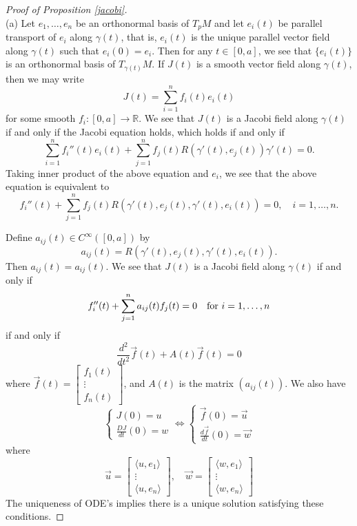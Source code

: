 \documentclass{amsart}
\numberwithin{equation}{section}
\theoremstyle{definition}
\theoremstyle{theorem}
\begin{document}
\begin{proof}[Proof of Proposition \ref{jacobi}] $ $\\
(a) Let $e_1, \ldots, e_n$ be an orthonormal basis of $T_pM$ and let $e_i(t)$ be parallel transport of $e_i$ along $\gamma(t)$, that is, $e_i(t)$ is the unique parallel vector field along $\gamma(t)$ such that $e_i(0) = e_i$. Then for any $t \in [0,a]$, 
we see that $\{e_i(t)\}$ is an orthonormal basis of $T_{\gamma(t)}M$. If $J(t)$ is a smooth vector field along $\gamma(t)$, then we may write 
\[
J(t) = \sum_{i=1}^n f_i(t)e_i(t)
\]
for some smooth $f_i : [0,a] \to \mathbb{R}$. We see that $J(t)$ is a Jacobi field along $\gamma(t)$ if and only if the Jacobi equation holds, 
which holds if and only if 
\[
\sum_{i=1}^n f_i''(t)e_i(t) + \sum_{j=1}^n f_j(t) R(\gamma'(t), e_j(t))\gamma'(t) = 0.
\]
Taking inner product of the above equation and $e_i$, we see that the above equation is equivalent to
$$
f_i''(t) +  \sum_{j=1}^n f_j(t) R(\gamma'(t), e_j(t),\gamma'(t),e_i(t)) =0,\quad i=1,\ldots,n.
$$

Define $a_{ij}(t)\in C^\infty([0,a])$ by 
\[
a_{ij}(t) = R(\gamma'(t), e_j(t), \gamma'(t), e_i(t)).
\]
Then $a_{ij}(t)= a_{ij}(t)$. We see that $J(t)$ is a Jacobi field along $\gamma(t)$ if and only if 
\[
f_i''(t) + \sum_{j=1}^n a_{ij}(t) f_j(t) = 0 \quad \textup{for }i=1,\ldots,n
\]
if and only if 
\[
\frac{d^2}{dt^2}\vec{f}(t) + A(t)\vec{f}(t) = 0
\]
where $\vec{f}(t)=\displaystyle{ \left[\begin{array}{c} f_1(t)\\ \vdots \\ f_n(t) \end{array}\right]}$, and 
$A(t)$ is the matrix $(a_{ij}(t))$. We also have  
\[
\begin{cases}
J(0) = u \\
\frac{D J}{dt}(0) = w
\end{cases}\Leftrightarrow
\begin{cases}
\vec{f}(0) = \vec{u}   \\
\frac{d\vec{f}}{dt}(0) =\vec{w}
\end{cases}
\]
where
$$
\vec{u}=  \left[\begin{array}{c} \langle u,e_1\rangle \\ \vdots \\ \langle u,e_n\rangle \end{array}\right],\quad
\vec{w}=  \left[\begin{array}{c} \langle w,e_1\rangle \\ \vdots \\ \langle w,e_n\rangle \end{array}\right]
$$
The uniqueness of ODE's implies there is a unique solution satisfying these conditions. 



\end{proof}
\end{document}
